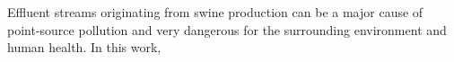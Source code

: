 Effluent streams originating from swine production can be a major cause of point-source pollution and very dangerous for the surrounding environment and human health. In this work, 